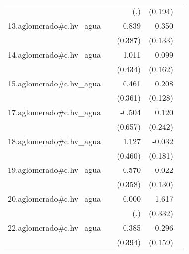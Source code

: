 {\begin{longtable}{l*{4}{D{.}{.}{-1}}}
            &                     &         (.)         &     (0.194)         &                     \\
\addlinespace
13.aglomerado#c.hv\_agua&                     &       0.839\sym{*}  &       0.350\sym{**} &                     \\
            &                     &     (0.387)         &     (0.133)         &                     \\
\addlinespace
14.aglomerado#c.hv\_agua&                     &       1.011\sym{*}  &       0.099         &                     \\
            &                     &     (0.434)         &     (0.162)         &                     \\
\addlinespace
15.aglomerado#c.hv\_agua&                     &       0.461         &      -0.208         &                     \\
            &                     &     (0.361)         &     (0.128)         &                     \\
\addlinespace
17.aglomerado#c.hv\_agua&                     &      -0.504         &       0.120         &                     \\
            &                     &     (0.657)         &     (0.242)         &                     \\
\addlinespace
18.aglomerado#c.hv\_agua&                     &       1.127\sym{*}  &      -0.032         &                     \\
            &                     &     (0.460)         &     (0.181)         &                     \\
\addlinespace
19.aglomerado#c.hv\_agua&                     &       0.570         &      -0.022         &                     \\
            &                     &     (0.358)         &     (0.130)         &                     \\
\addlinespace
20.aglomerado#c.hv\_agua&                     &       0.000         &       1.617\sym{***}&                     \\
            &                     &         (.)         &     (0.332)         &                     \\
\addlinespace
22.aglomerado#c.hv\_agua&                     &       0.385         &      -0.296         &                     \\
            &                     &     (0.394)         &     (0.159)         &                     \\

\end{longtable}}
